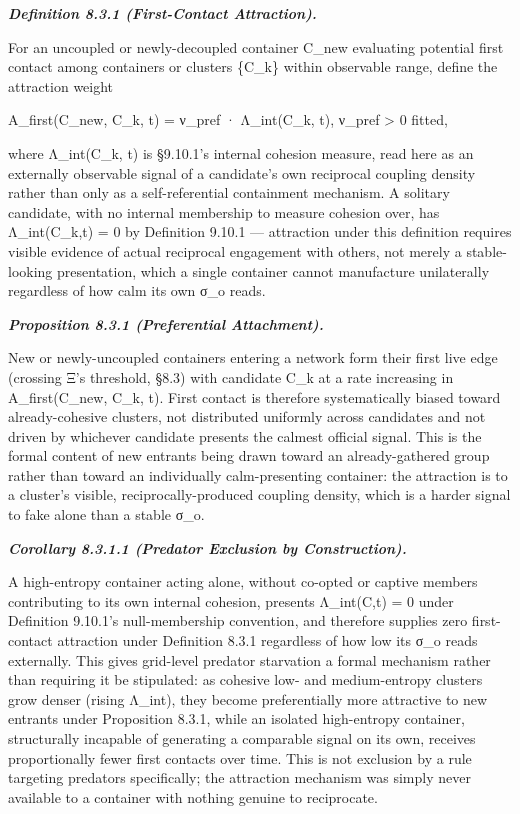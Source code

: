 \documentclass[
]{article}
\begin{document}
\emph{\textbf{Definition 8.3.1 (First-Contact Attraction).}}

For an uncoupled or newly-decoupled container C\_new evaluating
potential first contact among containers or clusters \{C\_k\} within
observable range, define the attraction weight

A\_first(C\_new, C\_k, t) = ν\_pref · Λ\_int(C\_k, t), ν\_pref
\textgreater{} 0 fitted,

where Λ\_int(C\_k, t) is §9.10.1's internal cohesion measure, read here
as an externally observable signal of a candidate's own reciprocal
coupling density rather than only as a self-referential containment
mechanism. A solitary candidate, with no internal membership to measure
cohesion over, has Λ\_int(C\_k,t) = 0 by Definition 9.10.1 ---
attraction under this definition requires visible evidence of actual
reciprocal engagement with others, not merely a stable-looking
presentation, which a single container cannot manufacture unilaterally
regardless of how calm its own σ\_o reads.

\emph{\textbf{Proposition 8.3.1 (Preferential Attachment).}}

New or newly-uncoupled containers entering a network form their first
live edge (crossing Ξ's threshold, §8.3) with candidate C\_k at a rate
increasing in A\_first(C\_new, C\_k, t). First contact is therefore
systematically biased toward already-cohesive clusters, not distributed
uniformly across candidates and not driven by whichever candidate
presents the calmest official signal. This is the formal content of new
entrants being drawn toward an already-gathered group rather than toward
an individually calm-presenting container: the attraction is to a
cluster's visible, reciprocally-produced coupling density, which is a
harder signal to fake alone than a stable σ\_o.

\emph{\textbf{Corollary 8.3.1.1 (Predator Exclusion by Construction).}}

A high-entropy container acting alone, without co-opted or captive
members contributing to its own internal cohesion, presents Λ\_int(C,t)
= 0 under Definition 9.10.1's null-membership convention, and therefore
supplies zero first-contact attraction under Definition 8.3.1 regardless
of how low its σ\_o reads externally. This gives grid-level predator
starvation a formal mechanism rather than requiring it be stipulated: as
cohesive low- and medium-entropy clusters grow denser (rising Λ\_int),
they become preferentially more attractive to new entrants under
Proposition 8.3.1, while an isolated high-entropy container,
structurally incapable of generating a comparable signal on its own,
receives proportionally fewer first contacts over time. This is not
exclusion by a rule targeting predators specifically; the attraction
mechanism was simply never available to a container with nothing genuine
to reciprocate.
\end{document}
